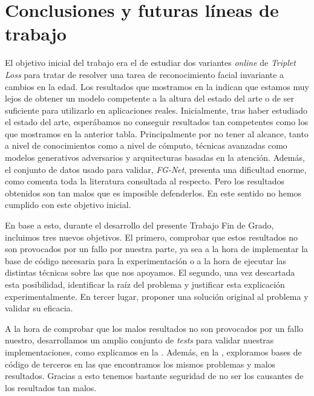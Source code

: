 \chapter{Conclusiones y futuras líneas de trabajo} \label{ich:conclusiones}

El objetivo inicial del trabajo era el de estudiar dos variantes \textit{online} de \textit{Triplet Loss} para tratar de resolver una tarea de reconocimiento facial invariante a cambios en la edad. Los resultados que mostramos en la \tableref{} indican que estamos muy lejos de obtener un modelo competente a la altura del estado del arte o de ser suficiente para utilizarlo en aplicaciones reales. Inicialmente, tras haber estudiado el estado del arte, esperábamos no conseguir resultados tan competentes como los que mostramos en la anterior tabla. Principalmente por no tener al alcance, tanto a nivel de conocimientos como a nivel de cómputo, técnicas avanzadas como modelos generativos adversarios y arquitecturas basadas en la atención. Además, el conjunto de datos usado para validar, \textit{FG-Net}, presenta una dificultad enorme, como comenta toda la literatura consultada al respecto. Pero los resultados obtenidos son tan malos que es imposible defenderlos. En este sentido no hemos cumplido con este objetivo inicial.

En base a esto, durante el desarrollo del presente Trabajo Fin de Grado, incluimos tres nuevos objetivos. El primero, comprobar que estos resultados no son provocados por un fallo por nuestra parte, ya sea a la hora de implementar la base de código necesaria para la experimentación o a la hora de ejecutar las distintas técnicas sobre las que nos apoyamos. El segundo, una vez descartada esta posibilidad, identificar la raíz del problema y justificar esta explicación experimentalmente. En tercer lugar, proponer una solución original al problema y validar su eficacia.

A la hora de comprobar que los malos resultados no son provocados por un fallo nuestro, desarrollamos un amplio conjunto de \textit{tests} para validar nuestras implementaciones, como explicamos en la \sectionref{}. Además, en la \sectionref{}, exploramos bases de código de terceros en las que encontramos los mismos problemas y malos resultados. Gracias a esto tenemos bastante seguridad de no ser los causantes de los resultados tan malos.

